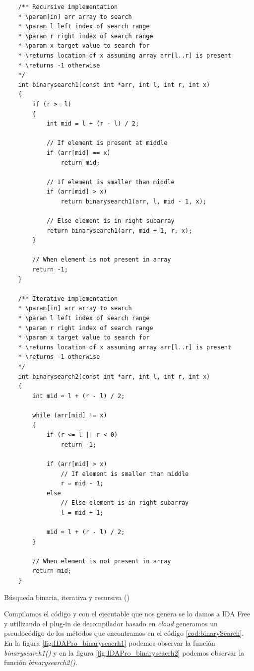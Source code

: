 \begin{mycode}
    \begin{verbatim}
    /** Recursive implementation
    * \param[in] arr array to search
    * \param l left index of search range
    * \param r right index of search range
    * \param x target value to search for
    * \returns location of x assuming array arr[l..r] is present
    * \returns -1 otherwise
    */
    int binarysearch1(const int *arr, int l, int r, int x)
    {
        if (r >= l)
        {
            int mid = l + (r - l) / 2;

            // If element is present at middle
            if (arr[mid] == x)
                return mid;

            // If element is smaller than middle
            if (arr[mid] > x)
                return binarysearch1(arr, l, mid - 1, x);

            // Else element is in right subarray
            return binarysearch1(arr, mid + 1, r, x);
        }

        // When element is not present in array
        return -1;
    }

    /** Iterative implementation
    * \param[in] arr array to search
    * \param l left index of search range
    * \param r right index of search range
    * \param x target value to search for
    * \returns location of x assuming array arr[l..r] is present
    * \returns -1 otherwise
    */
    int binarysearch2(const int *arr, int l, int r, int x)
    {
        int mid = l + (r - l) / 2;

        while (arr[mid] != x)
        {
            if (r <= l || r < 0)
                return -1;

            if (arr[mid] > x)
                // If element is smaller than middle
                r = mid - 1;
            else
                // Else element is in right subarray
                l = mid + 1;

            mid = l + (r - l) / 2;
        }

        // When element is not present in array
        return mid;
    }
    \end{verbatim}
    \caption[Búsqueda binaria, iterativa y recursiva]{Búsqueda binaria, iterativa y recursiva (\cite{BinarySearchGitHub})}
    \label{cod:binarySearch}
\end{mycode}

Compilamos el código y con el ejecutable que nos genera se lo damos a IDA Free y
utilizando el plug-in de decompilador basado en \textit{cloud} generamos un
pseudocódigo de los métodos que encontramos en el código \ref{cod:binarySearch}.
En la figura \ref{fig:IDAPro_binaryseacrh1} podemos observar la función \textit{binarysearch1()}
y en la figura \ref{fig:IDAPro_binaryseacrh2} podemos observar la función \textit{binarysearch2()}.

